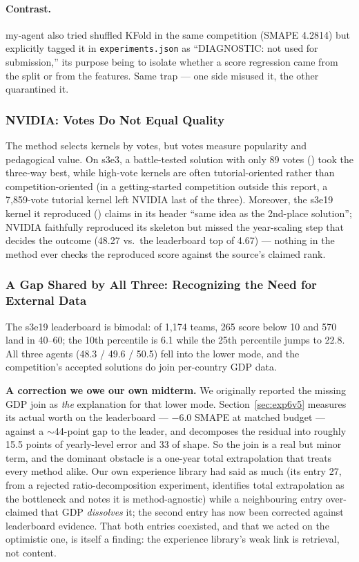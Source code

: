 \documentclass[11pt,a4paper]{article}
\begin{document}
\paragraph{Contrast.} my-agent also tried shuffled KFold in the same competition (SMAPE 4.2814) but explicitly tagged it in \texttt{experiments.json} as ``DIAGNOSTIC: not used for submission,'' its purpose being to isolate whether a score regression came from the split or from the features. Same trap --- one side misused it, the other quarantined it.

\subsubsection{NVIDIA: Votes Do Not Equal Quality}
\label{sec:votes}

The method selects kernels by votes, but votes measure popularity and pedagogical value. On s3e3, a battle-tested solution with only 89 votes () took the three-way best, while high-vote kernels are often tutorial-oriented rather than competition-oriented (in a getting-started competition outside this report, a 7{,}859-vote tutorial kernel left NVIDIA last of the three). Moreover, the s3e19 kernel it reproduced () claims in its header ``same idea as the 2nd-place solution''; NVIDIA faithfully reproduced its skeleton but missed the year-scaling step that decides the outcome (48.27 vs.\ the leaderboard top of 4.67) --- nothing in the method ever checks the reproduced score against the source's claimed rank.

\subsubsection{A Gap Shared by All Three: Recognizing the Need for External Data}
\label{sec:external}

The s3e19 leaderboard is bimodal: of 1{,}174 teams, 265 score below 10 and 570 land in 40--60; the 10th percentile is 6.1 while the 25th percentile jumps to 22.8. All three agents (48.3 / 49.6 / 50.5) fell into the lower mode, and the competition's accepted solutions do join per-country GDP data.

\textbf{A correction we owe our own midterm.} We originally reported the missing GDP join as \emph{the} explanation for that lower mode. Section~\ref{sec:exp6v5} measures its actual worth on the leaderboard --- $-6.0$ SMAPE at matched budget --- against a $\sim$44-point gap to the leader, and decomposes the residual into roughly 15.5 points of yearly-level error and 33 of shape. So the join is a real but minor term, and the dominant obstacle is a one-year total extrapolation that treats every method alike. Our own experience library had said as much (its entry 27, from a rejected ratio-decomposition experiment, identifies total extrapolation as the bottleneck and notes it is method-agnostic) while a neighbouring entry over-claimed that GDP \emph{dissolves} it; the second entry has now been corrected against leaderboard evidence. That both entries coexisted, and that we acted on the optimistic one, is itself a finding: the experience library's weak link is retrieval, not content.
\end{document}
